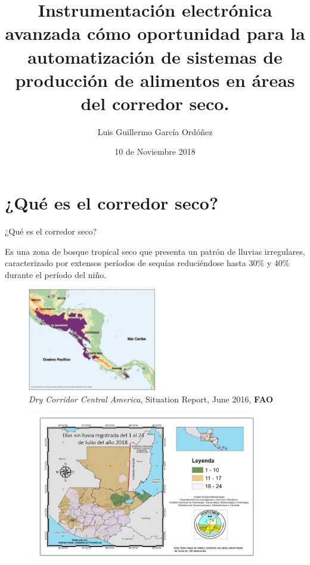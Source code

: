 \documentclass[]{beamer}
\title{Instrumentación electrónica avanzada cómo oportunidad para la automatización de sistemas de producción de alimentos en áreas del corredor seco.}
\author{Luis Guillermo García Ordóñez}
\date{10 de Noviembre 2018}
\begin{document}
\maketitle
\section{¿Qué es el corredor seco?}

\begin{frame}{¿Qué es el corredor seco?}

Es una zona de bosque tropical seco que presenta un patrón de lluvias irregulares, caracterizado por extensos períodos de sequías reduciéndose hasta 30\% y 40\% durante el período del niño.
\begin{figure}
    \centering
    \includegraphics[width=0.5\textwidth]{Docs/Mapa_CS}
    \caption{\small \textit{Dry Corridor Central America}, Situation Report, June 2016, \textbf{FAO}}
    \label{fig:my_label}
\end{figure}
\end{frame}

\begin{frame}{}
\begin{figure}
    \centering
    \includegraphics[width=0.9\textwidth]{Docs/diassinlluvia}
    \label{fig:my_label}
\end{figure}
\end{frame}
\end{document}
